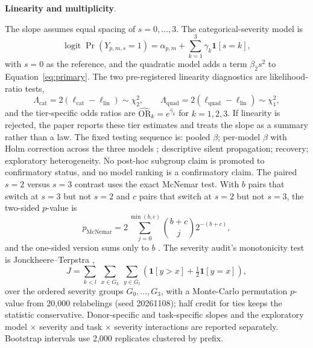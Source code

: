 \documentclass[a4paper,fleqn]{cas-sc}
\begin{document}
\noindent\textbf{Linearity and multiplicity}.\

The slope assumes equal spacing of $s=0,\dots,3$. The categorical-severity model is
\begin{equation}
  \operatorname{logit}\Pr(Y_{p,m,s}=1)
  =\alpha_{p,m}+\sum_{k=1}^{3}\gamma_k\mathbf{1}[s=k],
  \label{eq:categorical}
\end{equation}
with $s=0$ as the reference, and the quadratic model adds a term $\beta_2 s^2$ to
Equation~\ref{eq:primary}. The two pre-registered linearity diagnostics are likelihood-ratio
tests,
\begin{equation}
  \Lambda_{\mathrm{cat}}=2(\ell_{\mathrm{cat}}-\ell_{\mathrm{lin}})\sim\chi^{2}_{2},
  \qquad
  \Lambda_{\mathrm{quad}}=2(\ell_{\mathrm{quad}}-\ell_{\mathrm{lin}})\sim\chi^{2}_{1},
  \label{eq:lrt}
\end{equation}
and the tier-specific odds ratios are $\widehat{\mathrm{OR}}_k=e^{\hat\gamma_k}$ for
$k=1,2,3$. If linearity is rejected, the paper reports these tier estimates and treats the slope
as a summary rather than a law. The fixed testing sequence is: pooled $\beta$; per-model $\beta$
with Holm correction across the three models \cite{holm1979}; descriptive silent propagation;
recovery; exploratory heterogeneity. No post-hoc subgroup claim is promoted to confirmatory
status, and no model ranking is a confirmatory claim. The paired $s=2$ versus $s=3$ contrast uses
the exact McNemar test. With $b$ pairs that switch at $s=3$ but not $s=2$ and $c$ pairs that
switch at $s=2$ but not $s=3$, the two-sided $p$-value is
\begin{equation}
  p_{\mathrm{McNemar}}=
  2\sum_{j=0}^{\min(b,c)}\binom{b+c}{j}2^{-(b+c)},
  \label{eq:mcnemar}
\end{equation}
and the one-sided version sums only to $b$ \cite{mcnemar1947}. The severity audit's monotonicity
test is Jonckheere--Terpstra \cite{jonckheere1954},
\begin{equation}
  J=\sum_{k<l}\ \sum_{x\in G_k}\ \sum_{y\in G_l}
  \left(\mathbf{1}[y>x]+\tfrac12\mathbf{1}[y=x]\right),
  \label{eq:jt}
\end{equation}
over the ordered severity groups $G_0,\dots,G_3$, with a Monte-Carlo permutation $p$-value from
20{,}000 relabelings (seed 20261108); half credit for ties keeps the statistic conservative.
Donor-specific and task-specific slopes and the exploratory model $\times$ severity and task
$\times$ severity interactions are reported separately. Bootstrap intervals use 2{,}000
replicates clustered by prefix.
\end{document}
